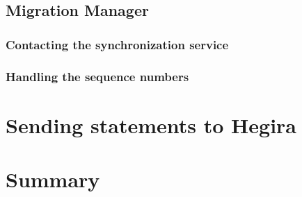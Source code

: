 \subsection{Migration Manager}
\subsubsection{Contacting the synchronization service}
\subsubsection{Handling the sequence numbers}
\section{Sending statements to Hegira}

\section{Summary}
